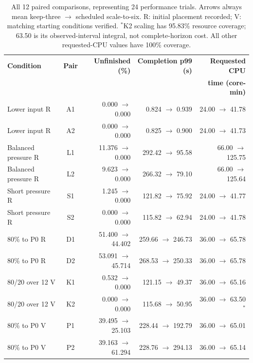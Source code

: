 \begin{table}[!htbp]
\centering\small
\setlength{\tabcolsep}{3pt}
\begin{tabular}{@{}lcrrr@{}}
\toprule
\textbf{Condition} & \textbf{Pair} & \textbf{Unfinished (\%)} & \textbf{Completion p99 (s)} & \textbf{Requested CPU}\\
 & & & & \textbf{time (core-min)}\\
\midrule

Lower input R & A1 & 0.000 $\to$ 0.000 & 0.824 $\to$ 0.939 & 24.00 $\to$ 41.78\\

Lower input R & A2 & 0.000 $\to$ 0.000 & 0.825 $\to$ 0.900 & 24.00 $\to$ 41.73\\

Balanced pressure R & L1 & 11.376 $\to$ 0.000 & 292.42 $\to$ 95.58 & 66.00 $\to$ 125.75\\

Balanced pressure R & L2 & 9.623 $\to$ 0.000 & 266.32 $\to$ 79.10 & 66.00 $\to$ 125.64\\

Short pressure R & S1 & 1.245 $\to$ 0.000 & 121.82 $\to$ 75.92 & 24.00 $\to$ 41.77\\

Short pressure R & S2 & 0.000 $\to$ 0.000 & 115.82 $\to$ 62.94 & 24.00 $\to$ 41.78\\

80\% to P0 R & D1 & 51.400 $\to$ 44.402 & 259.66 $\to$ 246.73 & 36.00 $\to$ 65.78\\

80\% to P0 R & D2 & 53.091 $\to$ 45.714 & 268.53 $\to$ 250.33 & 36.00 $\to$ 65.78\\

80/20 over 12 V & K1 & 0.532 $\to$ 0.000 & 121.15 $\to$ 49.37 & 36.00 $\to$ 65.16\\

80/20 over 12 V & K2 & 0.000 $\to$ 0.000 & 115.68 $\to$ 50.95 & 36.00 $\to$ 63.50$^{*}$\\

80\% to P0 V & P1 & 39.495 $\to$ 25.103 & 228.44 $\to$ 192.79 & 36.00 $\to$ 65.01\\

80\% to P0 V & P2 & 39.163 $\to$ 61.294 & 228.76 $\to$ 294.13 & 36.00 $\to$ 65.14\\

\bottomrule
\end{tabular}
\caption{All 12 paired comparisons, representing 24 performance trials. Arrows always mean keep-three $\to$ scheduled scale-to-six. R: initial placement recorded; V: matching starting conditions verified. $^{*}$K2 scaling has 95.83\% resource coverage; 63.50 is its observed-interval integral, not complete-horizon cost. All other requested-CPU values have 100\% coverage.}
\label{tab:preliminary-all}
\end{table}

